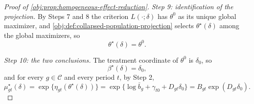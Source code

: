 \begin{proof}[Proof of \cref{obj:prop:homogeneous-effect-reduction}]
\textit{Step 9: identification of the projection.} By Steps 7 and 8 the criterion \(L(\cdot;\delta)\) has \(\theta^0\) as its unique global maximizer, and \cref{obj:def:collapsed-population-projection} selects \(\theta^\star(\delta)\) among the global maximizers, so
\[
\theta^\star(\delta)=\theta^0 .
\]

\textit{Step 10: the two conclusions.} The treatment coordinate of \(\theta^0\) is \(\delta_0\), so
\[
\beta^\star(\delta)=\delta_0 ,
\]
and for every \(g\in\mathcal C\) and every period \(t\), by Step 2,
\[
\mu^\star_{gt}(\delta)
=
\exp\{\eta_{gt}(\theta^\star(\delta))\}
=
\exp\{\log\bar b_g+\gamma_{t0}+D_{gt}\delta_0\}
=
B_{gt}\exp(D_{gt}\delta_0).
\]
\end{proof}

